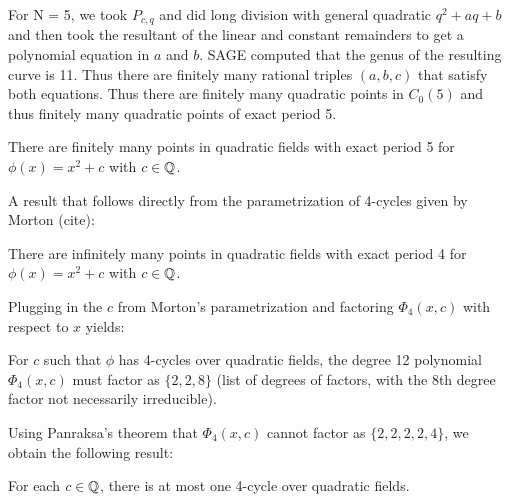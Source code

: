 For N = 5, we took $P_{c,q}$ and did long division with general
quadratic $q^2 + aq + b$ and then took the resultant of the linear and
constant remainders to get a polynomial equation in $a$ and $b$. SAGE
computed that the genus of the resulting curve is 11. Thus there are
finitely many rational triples $(a,b,c)$ that satisfy both
equations. Thus there are finitely many quadratic points in $C_0(5)$
and thus finitely many quadratic points of exact period 5.
\begin{theorem}
  There are finitely many points in quadratic fields with exact period
  5 for $\phi(x) = x^2 + c$ with $c \in \mathbb{Q}$.
\end{theorem}

A result that follows directly from the parametrization of 4-cycles
given by Morton (cite):
\begin{theorem}
  There are infinitely many points in quadratic fields with exact
  period 4 for $\phi(x) = x^2 + c$ with $c \in \mathbb{Q}$.
\end{theorem}

Plugging in the $c$ from Morton's parametrization and factoring
$\Phi_4(x,c)$ with respect to $x$ yields:
\begin{lemma}
  For $c$ such that $\phi$ has 4-cycles over quadratic fields, the
  degree 12 polynomial $\Phi_4(x,c)$ must factor as $\{2,2,8\}$ (list
  of degrees of factors, with the 8th degree factor not necessarily
  irreducible).
\end{lemma}

Using Panraksa's theorem that $\Phi_4(x,c)$ cannot factor as
$\{2,2,2,2,4\}$, we obtain the following result:
\begin{theorem}
  For each $c \in \mathbb{Q}$, there is at most one 4-cycle over quadratic
  fields.
\end{theorem}


